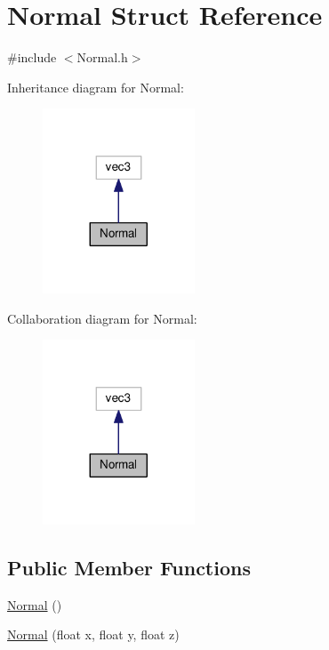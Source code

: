 \hypertarget{struct_normal}{}\section{Normal Struct Reference}
\label{struct_normal}


{\ttfamily \#include $<$Normal.\+h$>$}



Inheritance diagram for Normal\+:
\nopagebreak
\begin{figure}[H]
\begin{center}
\leavevmode
\includegraphics[width=128pt]{struct_normal__inherit__graph}
\end{center}
\end{figure}


Collaboration diagram for Normal\+:
\nopagebreak
\begin{figure}[H]
\begin{center}
\leavevmode
\includegraphics[width=128pt]{struct_normal__coll__graph}
\end{center}
\end{figure}
\subsection*{Public Member Functions}
\begin{DoxyCompactItemize}
\item 
\hyperlink{struct_normal_af62e51ec40dc2eedc3b9ca49ebdc7197}{Normal} ()
\item 
\hyperlink{struct_normal_acf08fa0dafb56ea445b20c882a503292}{Normal} (float x, float y, float z)
\end{DoxyCompactItemize}


